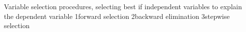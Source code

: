 
Variable selection procedures, selecting best if independent variables to explain the dependent variable
1forward selection
2backward elimination
3stepwise selection
